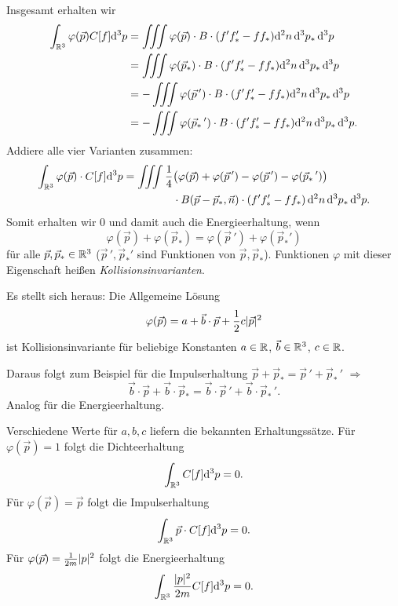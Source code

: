 Insgesamt erhalten wir
\begin{align*}
  \int_{\mathbb{R}^3} \varphi(\vec{p}) C[f] \mathrm{d}^3 p
  &= \iiint \varphi(\vec{p}) \cdot B \cdot (f' f_*' - f f_*)
    \mathrm{d}^2 n \, \mathrm{d}^3 p_* \, \mathrm{d}^3 p \\
  &= \iiint \varphi(\vec{p}_*) \cdot B \cdot (f' f_*' - f f_*)
    \mathrm{d}^2 n \, \mathrm{d}^3 p_* \, \mathrm{d}^3 p \\
  &= - \iiint \varphi(\vec{p}\,') \cdot B \cdot (f' f_*' - f f_*)
    \mathrm{d}^2 n \, \mathrm{d}^3 p_* \, \mathrm{d}^3 p \\
  &= - \iiint \varphi(\vec{p}_*\,') \cdot B \cdot (f' f_*' - f f_*)
    \mathrm{d}^2 n \, \mathrm{d}^3 p_* \, \mathrm{d}^3 p.
\end{align*}
Addiere alle vier Varianten zusammen:
\[ \begin{aligned}
    \int_{\mathbb{R}^3} \varphi(\vec{p}) \cdot C[f] \mathrm{d}^3 p =
    \iiint \frac{1}{4} &\big( \varphi(\vec{p}) + \varphi(\vec{p}\,') - \varphi( \vec{p}\,')
    - \varphi( \vec{p}_*\,') \big) \\
    &\cdot B( \vec{p} - \vec{p}_*, \vec{n} )
    \cdot (f'f_*' - ff_*) \,
    \mathrm{d}^2 n \, \mathrm{d}^3 p_* \, \mathrm{d}^3 p.
  \end{aligned}
\]
Somit erhalten wir 0 und damit auch die Energieerhaltung, wenn 
\[ \varphi( \vec{p} ) + \varphi( \vec{p}_* ) = \varphi( \vec{p}\,' ) + \varphi(
  \vec{p}_*') \]
für alle $\vec{p}, \vec{p}_* \in \mathbb{R}^3$ ($\vec{p}\,', \vec{p}_*'$ sind
Funktionen von $\vec{p}, \vec{p}_*$). Funktionen $\varphi$ mit dieser Eigenschaft heißen \emph{Kollisionsinvarianten}.

Es stellt sich heraus: Die Allgemeine Lösung
\[ \varphi( \vec{p} ) = a + \vec{b} \cdot \vec{p} + \frac{1}{2} c |\vec{p}|^2 \]
ist Kollisionsinvariante für beliebige Konstanten $a \in \mathbb{R}$, $\vec{b} \in
\mathbb{R}^3$, $c \in \mathbb{R}$.

Daraus folgt zum Beispiel für die Impulserhaltung $\vec{p} + \vec{p}_* =
\vec{p}\,' + \vec{p}_*\,'$ $\Rightarrow$
\[ \vec{b} \cdot \vec{p} + \vec{b} \cdot \vec{p}_*
  = \vec{b} \cdot \vec{p}\,' + \vec{b} \cdot \vec{p}_*\,'. \]
Analog für die Energieerhaltung.

Verschiedene Werte für $a,b,c$ liefern die bekannten Erhaltungssätze. Für
$\varphi(\vec{p}) = 1$ folgt die Dichteerhaltung
\[ \int_{\mathbb{R}^3} C[f] \mathrm{d}^3 p = 0. \]
Für $\varphi(\vec{p}) = \vec{p}$ folgt die Impulserhaltung
\[ \int_{\mathbb{R}^3} \vec{p} \cdot C[f] \mathrm{d}^3 p = 0. \]
Für $\varphi(\vec{p}) = \frac{1}{2m} |p|^2$ folgt die Energieerhaltung
\[ \int_{\mathbb{R}^3} \frac{|p|^2}{2m} C[f] \mathrm{d}^3 p = 0. \]

